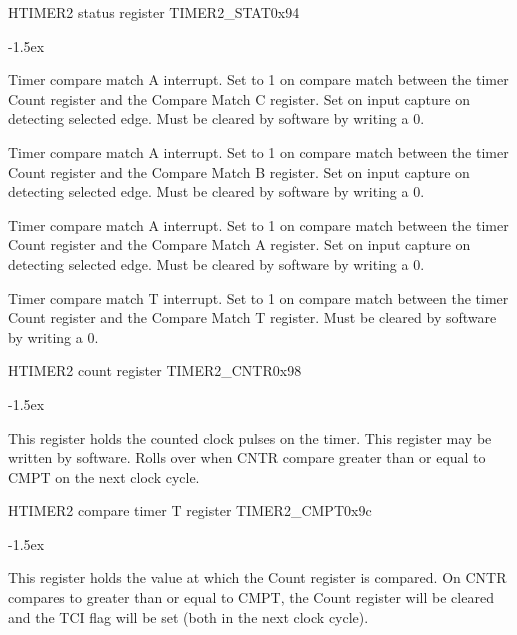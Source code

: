 \documentclass[12pt]{article}
\begin{document}
\begin{register}{H}{TIMER2 status register TIMER2\_STAT}{0x94}
\label{timer2stat}
%
%
%
%
%
\regnewline%
\end{register}
\begin{regdesc}[0.8\textwidth]\begin{reglist}[0000]
\itemsep-1.5ex
\item[CCI] Timer compare match A interrupt. Set to 1 on compare match between the timer Count register and the Compare Match C register. Set on input capture on detecting selected edge. Must be cleared by software by writing a 0.
\item[BCI] Timer compare match A interrupt. Set to 1 on compare match between the timer Count register and the Compare Match B register. Set on input capture on detecting selected edge. Must be cleared by software by writing a 0.
\item[ACI] Timer compare match A interrupt. Set to 1 on compare match between the timer Count register and the Compare Match A register. Set on input capture on detecting selected edge. Must be cleared by software by writing a 0.
\item[TCI] Timer compare match T interrupt. Set to 1 on compare match between the timer Count register and the Compare Match T register. Must be cleared by software by writing a 0.
\end{reglist}\end{regdesc}

\begin{register}{H}{TIMER2 count register TIMER2\_CNTR}{0x98}
\label{timer2cntr}
%
%
\regnewline%
\end{register}
\begin{regdesc}[0.8\textwidth]\begin{reglist}[00000]
\itemsep-1.5ex
\item[CNTR] This register holds the counted clock pulses on the timer. This register may be written by software. Rolls over when CNTR compare greater than or equal to CMPT on the next clock cycle.
\end{reglist}\end{regdesc}

\begin{register}{H}{TIMER2 compare timer T register TIMER2\_CMPT}{0x9c}
\label{timer2cmpt}
%
\regnewline%
\end{register}
\begin{regdesc}[0.8\textwidth]\begin{reglist}[00000]
\itemsep-1.5ex
\item[CMPT] This register holds the value at which the Count register is compared. On CNTR compares to greater than or equal to CMPT, the Count register will be cleared and the TCI flag will be set (both in the next clock cycle).
\end{reglist}\end{regdesc}
\end{document}
